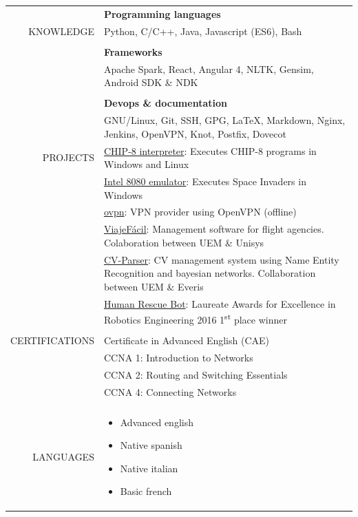 \documentclass[a4paper, 11pt]{article}
\begin{document}
\begin{longtable}{r|p{12cm}}
    & \textbf{Programming languages}
    \\
    KNOWLEDGE
    & Python, C/C++, Java, Javascript (ES6), Bash
    \\\\
    & \textbf{Frameworks}
    \\
    & Apache Spark, React, Angular 4, NLTK, Gensim, Android SDK \& NDK
    \\\\
    & \textbf{Devops \& documentation}
    \\
    & GNU/Linux, Git, SSH, GPG, \LaTeX, Markdown, Nginx, Jenkins, OpenVPN, Knot, Postfix, Dovecot
    \\\pagebreak
    PROJECTS
    & \href{https://github.com/hugo19941994/CHIP8-Emu}{CHIP-8 interpreter}: Executes CHIP-8 programs in Windows and Linux
    \\
    & \href{https://github.com/hugo19941994/SpaceInvaders-Emu}{Intel 8080 emulator}: Executes Space Invaders in Windows
    \\
    & \href{https://vpn.hugofs.com}{ovpn}: VPN provider using OpenVPN (offline)
    \\
    & \href{https://github.com/hugo19941994/ViajeFacil}{ViajeFácil}: Management software for flight agencies. Colaboration between UEM \& Unisys
    \\
    & \href{https://github.com/hugo19941994/CV-Parser}{CV-Parser}: CV management system using Name Entity Recognition and bayesian networks. Collaboration between UEM \& Everis
    \\
    & \href{https://github.com/hugo19941994/robot}{Human Rescue Bot}: Laureate Awards for Excellence in Robotics Engineering 2016 1\textsuperscript{st} place winner
    \\\\
    CERTIFICATIONS
    & Certificate in Advanced English (CAE)
    \\
    & CCNA 1: Introduction to Networks
    \\
    & CCNA 2: Routing and Switching Essentials
    \\
    & CCNA 4: Connecting Networks
    \\\\
    LANGUAGES
    & \vspace{-1.85\baselineskip} %
    \begin{multicols}{2}
        \begin{itemize}[leftmargin=0cm, label={}, noitemsep]
            \item Advanced english
            \item Native spanish
            \item Native italian
            \item Basic french
        \end{itemize}
    \end{multicols}
\end{longtable}
\end{document}
